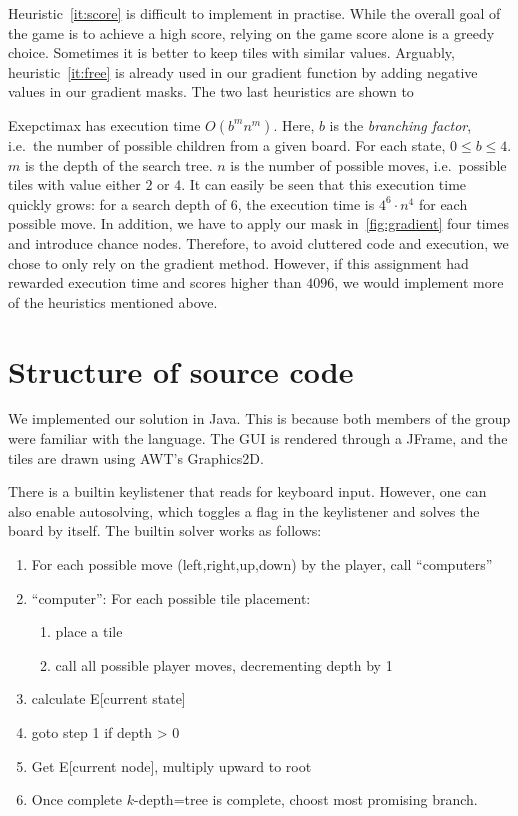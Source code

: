 \documentclass[journal]{IEEEtran}
\begin{document}
Heuristic~\ref{it:score} is difficult to implement in practise. While the overall
goal of the game is to achieve a high score, relying on the game score alone
is a greedy choice. Sometimes it is better to keep tiles with similar values.
Arguably, heuristic~\ref{it:free} is already used in our gradient
function by adding negative values in our gradient masks. The two last
heuristics are shown to

Exepctimax has execution time $O(b^{m}n^{m})$. Here, $b$ is the \textit{branching factor},
i.e.\ the number of possible children from a given board. For each state, $0
\leq b \leq 4$.  $m$ is the depth of the search tree. $n$ is the number of possible
moves, i.e.\ possible tiles with value either $2$ or $4$. It can easily be seen
that this execution time quickly grows: for a search depth of 6, the execution
time is $4^{6}\cdot{n^{4}}$ for each possible move. In addition, we have to apply our mask
in~\autoref{fig:gradient} four times and introduce chance nodes. Therefore, to
avoid cluttered code and execution, we chose to only rely on the gradient
method. However, if this assignment had rewarded execution time and scores
higher than $4096$, we would implement more of the heuristics mentioned above.

\section*{Structure of source code}
We implemented our solution in Java. This is because both members of the group
were familiar with the language. The GUI is rendered through a JFrame, and the tiles are
drawn using AWT's Graphics2D.

There is a builtin keylistener that reads for keyboard input. However, one can also
enable autosolving, which toggles a flag in the keylistener and solves the board by
itself. The builtin solver works as follows:
\begin{framed}
\begin{enumerate}
    \item For each possible move (left,right,up,down) by the player, call ``computers''
    \item ``computer'': For each possible tile placement:
        \begin{enumerate}
            \item place a tile
            \item call all possible player moves,
                decrementing depth by 1
        \end{enumerate}
    \item calculate E[current state]
    \item \dotso{} goto step 1 if depth \textgreater{} 0
    \item Get E[current node], multiply upward to root
    \item Once complete $k$-depth=tree is complete, choost most promising branch.
\end{enumerate}
\end{framed}
\end{document}
